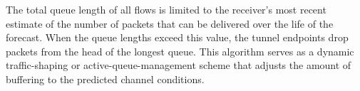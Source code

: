 The total queue length of all flows is limited to the receiver's most
recent estimate of the number of packets that can be delivered over
the life of the forecast. When the queue lengths exceed this value,
the tunnel endpoints drop packets from the head of the longest
queue. This algorithm serves as a dynamic traffic-shaping or
active-queue-management scheme that adjusts the amount of buffering to
the predicted channel conditions.
